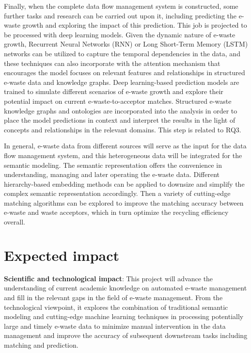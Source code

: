 \documentclass{article}
\numberwithin{equation}{section}
\begin{document}
Finally, when the complete data flow management system is constructed, some further tasks and research can be carried out upon it, including predicting the e-waste growth and exploring the impact of this prediction. This job is projected to be processed with deep learning models. Given the dynamic nature of e-waste growth, Recurrent Neural Networks (RNN) or Long Short-Term Memory (LSTM)\cite{lipt15} networks can be utilized to capture the temporal dependencies in the data, and these techniques can also incorporate with the attention mechanism that encourages the model focuses on relevant features and relationships in structured e-waste data and knowledge graphs. Deep learning-based prediction models are trained to simulate different scenarios of e-waste growth and explore their potential impact on current e-waste-to-acceptor matches. Structured e-waste knowledge graphs and ontologies are incorporated into the analysis in order to place the model predictions in context and interpret the results in the light of concepts and relationships in the relevant domains. This step is related to RQ3.

In general, e-waste data from different sources will serve as the input for the data flow management system, and this heterogeneous data will be integrated for the semantic modeling. The semantic representation offers the convenience in understanding, managing and later operating the e-waste data. Different hierarchy-based embedding methods can be applied to downsize and simplify the complex semantic representation accordingly. Then a variety of cutting-edge matching algorithms can be explored to improve the matching accuracy between e-waste and waste acceptors, which in turn optimize the recycling efficiency overall.

\section{Expected impact}
\textbf{Scientific and technological impact}: This project will advance the understanding of current academic knowledge on automated e-waste management and fill in the relevant gaps in the field of e-waste management. From the technological viewpoint, it explores the combination of traditional semantic modeling and cutting-edge machine learning techniques in processing potentially large and timely e-waste data to minimize manual intervention in the data management and improve the accuracy of subsequent downstream tasks including matching and prediction.
\end{document}
